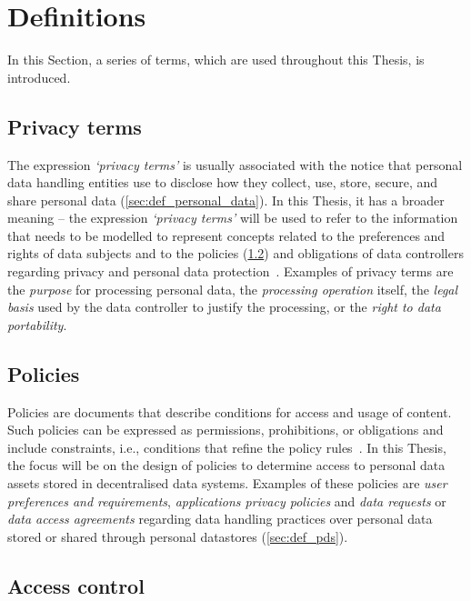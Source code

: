 \section{Definitions}
\label{sec:definitions}

In this Section, a series of terms, which are used throughout this Thesis, is introduced.

\subsection{Privacy terms}
\label{sec:def_privacy_terms}

The expression \textit{`privacy terms'} is usually associated with the notice that personal data handling entities use to disclose how they collect, use, store, secure, and share personal data (\ref{sec:def_personal_data}).
In this Thesis, it has a broader meaning -- the expression \textit{`privacy terms'} will be used to refer to the information that needs to be modelled to represent concepts related to the preferences and rights of data subjects and to the policies (\ref{sec:def_policies}) and obligations of data controllers regarding privacy and personal data protection~\citep{esteves_challenges_2021}.
Examples of privacy terms are the \textit{purpose} for processing personal data, the \textit{processing operation} itself, the \textit{legal basis} used by the data controller to justify the processing, or the \textit{right to data portability}.

\subsection{Policies}
\label{sec:def_policies}

Policies are documents that describe conditions for access and usage of content.
Such policies can be expressed as permissions, prohibitions, or obligations and include constraints, i.e., conditions that refine the policy rules~\citep{iannella_odrl_2018}.
In this Thesis, the focus will be on the design of policies to determine access to personal data assets stored in decentralised data systems. 
Examples of these policies are \textit{user preferences and requirements}, \textit{applications privacy policies} and \textit{data requests} or \textit{data access agreements} regarding data handling practices over personal data stored or shared through personal datastores (\ref{sec:def_pds}).

\subsection{Access control}
\label{sec:def_access_control}

